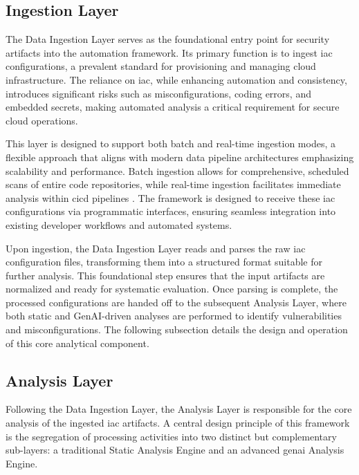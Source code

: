 \subsection{Ingestion Layer} %
\label{subsec:data-ingestion-layer}

The Data Ingestion Layer serves as the foundational entry point for security artifacts into the automation framework. Its primary function is to ingest \gls{iac} configurations, a prevalent standard for provisioning and managing cloud infrastructure. The reliance on \gls{iac}, while enhancing automation and consistency, introduces significant risks such as misconfigurations, coding errors, and embedded secrets, making automated analysis a critical requirement for secure cloud operations.

This layer is designed to support both batch and real-time ingestion modes, a flexible approach that aligns with modern data pipeline architectures emphasizing scalability and performance\cite{alevizos_towards_2024}. Batch ingestion allows for comprehensive, scheduled scans of entire code repositories, while real-time ingestion facilitates immediate analysis within \gls{cicd} pipelines \cite{gunathilaka_context-aware_2025}. The framework is designed to receive these \gls{iac} configurations via programmatic interfaces, ensuring seamless integration into existing developer workflows and automated systems.

Upon ingestion, the Data Ingestion Layer reads and parses the raw \gls{iac} configuration files, transforming them into a structured format suitable for further analysis. This foundational step ensures that the input artifacts are normalized and ready for systematic evaluation. Once parsing is complete, the processed configurations are handed off to the subsequent Analysis Layer, where both static and GenAI-driven analyses are performed to identify vulnerabilities and misconfigurations. The following subsection details the design and operation of this core analytical component.

\subsection{Analysis Layer}
\label{subsec:analysis-layer}

Following the Data Ingestion Layer, the Analysis Layer is responsible for the core analysis of the ingested \gls{iac} artifacts. A central design principle of this framework is the segregation of processing activities into two distinct but complementary sub-layers: a traditional Static Analysis Engine and an advanced \gls{genai} Analysis Engine.

